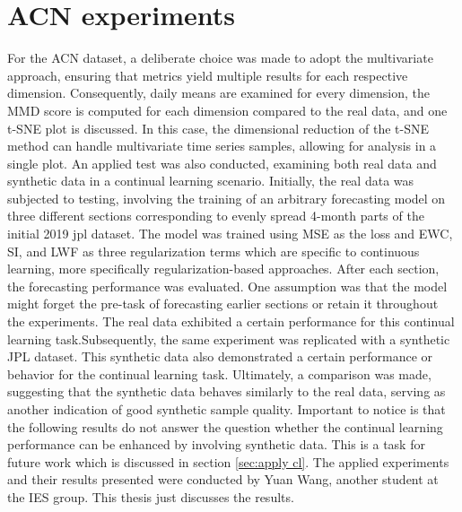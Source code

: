 \section{ACN experiments}
For the ACN dataset, a deliberate choice was made to adopt the multivariate approach, ensuring that metrics yield multiple results for each respective dimension. Consequently, daily means are examined for every dimension, the MMD score is computed for each dimension compared to the real data, and one t-SNE plot is discussed. In this case, the dimensional reduction of the t-SNE method can handle multivariate time series samples, allowing for analysis in a single plot.\newline
An applied test was also conducted, examining both real data and synthetic data in a continual learning scenario. Initially, the real data was subjected to testing, involving the training of an arbitrary forecasting model on three different sections corresponding to evenly spread 4-month parts of the initial 2019 jpl dataset. The model was trained using MSE as the loss and EWC, SI, and LWF as three regularization terms which are specific to continuous learning, more specifically regularization-based approaches. After each section, the forecasting performance was evaluated. One assumption was that the model might forget the pre-task of forecasting earlier sections or retain it throughout the experiments. The real data exhibited a certain performance for this continual learning task.Subsequently, the same experiment was replicated with a synthetic JPL dataset. This synthetic data also demonstrated a certain performance or behavior for the continual learning task. Ultimately, a comparison was made, suggesting that the synthetic data behaves similarly to the real data, serving as another indication of good synthetic sample quality. Important to notice is that the following results do not answer the question whether the continual learning performance can be enhanced by involving synthetic data. This is a task for future work which is discussed in section \ref{sec:apply cl}. The applied experiments and their results presented were conducted by Yuan Wang, another student at the IES group. This thesis just discusses the results.